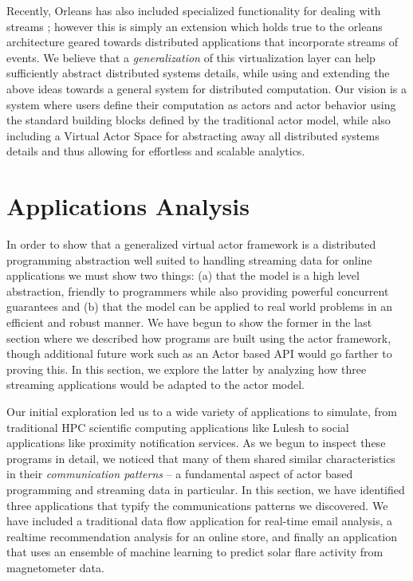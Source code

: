 \documentclass[conference,twocolumn,10pt]{IEEEtran}
\begin{document}
Recently, Orleans has also included specialized functionality for dealing with streams \cite{orleans_streams}; however this is simply an extension which holds true to the orleans architecture geared towards distributed applications that incorporate streams of events. We believe that a \textit{generalization} of this virtualization layer can help sufficiently abstract distributed systems details, while using and extending the above ideas towards a general  system for distributed computation. Our vision is a system where users define their computation as actors and actor behavior using the standard building blocks defined by the traditional actor model, while also including a Virtual Actor Space for abstracting away all distributed systems details and thus allowing for effortless and scalable analytics.




\section{Applications Analysis}

In order to show that a generalized virtual actor framework is a distributed programming abstraction well suited to handling streaming data for online applications we must show two things: (a) that the model is a high level abstraction, friendly to programmers while also providing powerful concurrent guarantees and (b) that the model can be applied to real world problems in an efficient and robust manner. We have begun to show the former in the last section where we described how programs are built using the actor framework, though additional future work such as an Actor based API would go farther to proving this. In this section, we explore the latter by analyzing how three streaming applications would be adapted to the actor model.

Our initial exploration led us to a wide variety of applications to simulate, from traditional HPC scientific computing applications like Lulesh to social applications like proximity notification services. As we begun to inspect these programs in detail, we noticed that many of them shared similar characteristics in their \textit{communication patterns} -- a fundamental aspect of actor based programming and streaming data in particular. In this section, we have identified three applications that typify the communications patterns we discovered. We have included a traditional data flow application for real-time email analysis, a realtime recommendation analysis for an online store, and finally an application that uses an ensemble of machine learning to predict solar flare activity from magnetometer data.
\end{document}
